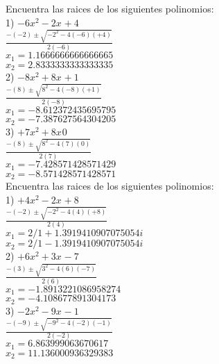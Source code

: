 \documentclass[a4paper,12pt]{article}
\begin{document}
 \pagebreak 
Encuentra las raices de los siguientes polinomios: \vspace{1cm}\\ 
1) $ -6x^{2}-2x^{}+4$ 
\vspace{0.5cm}\\ 
$\frac{-(-2)\pm\sqrt{-2^2-4(-6)(+4)}  }{2(-6)}$
\vspace{0.5cm}\\
$x_1=1.1666666666666665$\\
$x_2=2.8333333333333335$
\vspace{1cm}\\ 
2) $ -8x^{2}+8x^{}+1$ 
\vspace{0.5cm}\\ 
$\frac{-(8)\pm\sqrt{8^2-4(-8)(+1)}  }{2(-8)}$
\vspace{0.5cm}\\
$x_1=-8.612372435695795$\\
$x_2=-7.387627564304205$
\vspace{1cm}\\ 
3) $ +7x^{2}+8x^{}0$ 
\vspace{0.5cm}\\ 
$\frac{-(8)\pm\sqrt{8^2-4(7)(0)}  }{2(7)}$
\vspace{0.5cm}\\
$x_1=-7.428571428571429$\\
$x_2=-8.571428571428571$
\vspace{1cm}\\ 

 \pagebreak 
Encuentra las raices de los siguientes polinomios: \vspace{1cm}\\ 
1) $ +4x^{2}-2x^{}+8$ 
\vspace{0.5cm}\\ 
$\frac{-(-2)\pm\sqrt{-2^2-4(4)(+8)}  }{2(4)}$
\vspace{0.5cm}\\
$x_1=2/1+1.3919410907075054i$\\
$x_2=2/1-1.3919410907075054i$
\vspace{1cm}\\ 
2) $ +6x^{2}+3x^{}-7$ 
\vspace{0.5cm}\\ 
$\frac{-(3)\pm\sqrt{3^2-4(6)(-7)}  }{2(6)}$
\vspace{0.5cm}\\
$x_1=-1.8913221086958274$\\
$x_2=-4.108677891304173$
\vspace{1cm}\\ 
3) $ -2x^{2}-9x^{}-1$ 
\vspace{0.5cm}\\ 
$\frac{-(-9)\pm\sqrt{-9^2-4(-2)(-1)}  }{2(-2)}$
\vspace{0.5cm}\\
$x_1=6.863999063670617$\\
$x_2=11.136000936329383$
\vspace{1cm}\\ 

 \pagebreak 
\end{document}
